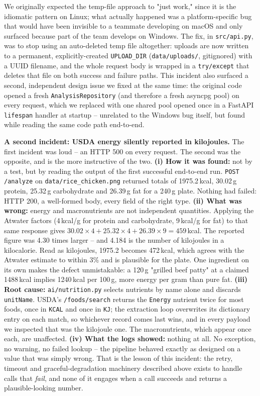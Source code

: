 \documentclass[11pt,a4paper]{article}
\begin{document}
We originally expected the temp-file approach to "just work," since it is the idiomatic pattern on Linux; what actually happened was a platform-specific bug that would have been invisible to a teammate developing on macOS and only surfaced because part of the team develops on Windows. The fix, in \texttt{src/api.py}, was to stop using an auto-deleted temp file altogether: uploads are now written to a permanent, explicitly-created \texttt{UPLOAD\_DIR} (\texttt{data/uploads/}, gitignored) with a UUID filename, and the whole request body is wrapped in a \texttt{try/except} that deletes that file on both success and failure paths. This incident also surfaced a second, independent design issue we fixed at the same time: the original code opened a fresh \texttt{AnalysisRepository} (and therefore a fresh asyncpg pool) on every request, which we replaced with one shared pool opened once in a FastAPI \texttt{lifespan} handler at startup -- unrelated to the Windows bug itself, but found while reading the same code path end-to-end.

\medskip
\noindent\textbf{A second incident: USDA energy silently reported in kilojoules.} The first incident was loud -- an HTTP 500 on every request. The second was the opposite, and is the more instructive of the two. \textbf{(i) How it was found:} not by a test, but by reading the output of the first successful end-to-end run. \texttt{POST /analyze} on \texttt{data/rice\_chicken.png} returned totals of 1975.2\,kcal, 30.02\,g protein, 25.32\,g carbohydrate and 26.39\,g fat for a 240\,g plate. Nothing had failed: HTTP 200, a well-formed body, every field of the right type. \textbf{(ii) What was wrong:} energy and macronutrients are not independent quantities. Applying the Atwater factors (4\,kcal/g for protein and carbohydrate, 9\,kcal/g for fat) to that same response gives $30.02\times4 + 25.32\times4 + 26.39\times9 = 459$\,kcal. The reported figure was 4.30 times larger -- and 4.184 is the number of kilojoules in a kilocalorie. Read as kilojoules, 1975.2 becomes 472\,kcal, which agrees with the Atwater estimate to within 3\% and is plausible for the plate. One ingredient on its own makes the defect unmistakable: a 120\,g "grilled beef patty" at a claimed 1488\,kcal implies 1240\,kcal per 100\,g, more energy per gram than pure fat. \textbf{(iii) Root cause:} \texttt{ai/nutrition.py} selects nutrients by name alone and discards \texttt{unitName}. USDA's \texttt{/foods/search} returns the \texttt{Energy} nutrient twice for most foods, once in \texttt{KCAL} and once in \texttt{KJ}; the extraction loop overwrites its dictionary entry on each match, so whichever record comes last wins, and in every payload we inspected that was the kilojoule one. The macronutrients, which appear once each, are unaffected. \textbf{(iv) What the logs showed:} nothing at all. No exception, no warning, no failed lookup -- the pipeline behaved exactly as designed on a value that was simply wrong. That is the lesson of this incident: the retry, timeout and graceful-degradation machinery described above exists to handle calls that \emph{fail}, and none of it engages when a call succeeds and returns a plausible-looking number.
\end{document}

